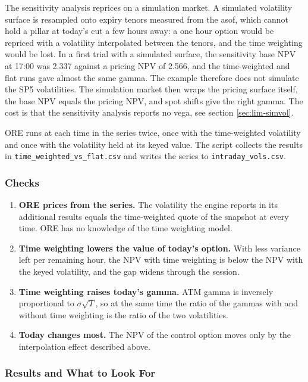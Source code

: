\documentclass[12pt, a4paper]{article}
\begin{document}
The sensitivity analysis reprices on a simulation market. A simulated volatility surface is resampled onto expiry
tenors measured from the asof, which cannot hold a pillar at today's cut a few hours away: a one hour option would be
repriced with a volatility interpolated between the tenors, and the time weighting would be lost. In a first trial with a
simulated surface, the sensitivity base NPV at 17:00 was 2.337 against a pricing NPV of 2.566, and the time-weighted and flat
runs gave almost the same gamma. The example therefore does not simulate the SP5 volatilities. The simulation market
then wraps the pricing surface itself, the base NPV equals the pricing NPV, and spot shifts give the right gamma. The
cost is that the sensitivity analysis reports no vega, see section \ref{sec:lim-simvol}.

ORE runs at each time in the series twice, once with the time-weighted volatility and once with the volatility held at its
keyed value. The script collects the results in \texttt{time\_weighted\_vs\_flat.csv} and writes the series to
\texttt{intraday\_vols.csv}.

\subsubsection*{Checks}

\begin{enumerate}
\item \textbf{ORE prices from the series.} The volatility the engine reports in its additional results equals the
  time-weighted quote of the snapshot at every time. ORE has no knowledge of the time weighting model.
\item \textbf{Time weighting lowers the value of today's option.} With less variance left per remaining hour, the NPV with
  time weighting is below the NPV with the keyed volatility, and the gap widens through the session.
\item \textbf{Time weighting raises today's gamma.} ATM gamma is inversely proportional to $\sigma\sqrt{T}$, so at the same time
  the ratio of the gammas with and without time weighting is the ratio of the two volatilities.
\item \textbf{Today changes most.} The NPV of the control option moves only by the interpolation effect described
  above.
\end{enumerate}

\subsubsection*{Results and What to Look For}
\end{document}
